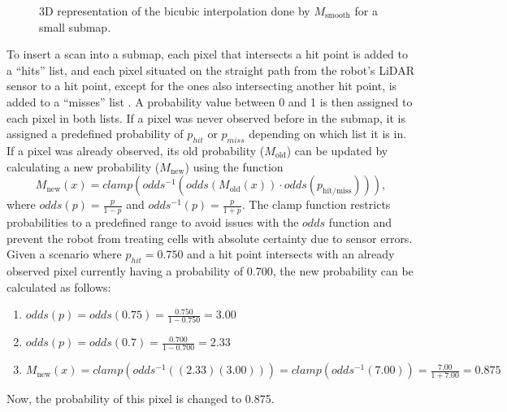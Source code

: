 \begin{figure}[!htb]
    \centering
    \qquad
    \caption{3D representation of the bicubic interpolation done by $M_\text{smooth}$ for a small submap.}
    \label{fig:bicubic}
\end{figure}

To insert a scan into a submap, each pixel that intersects a hit point is added to a ``hits'' list, and each pixel situated on the straight path from the robot's LiDAR sensor to a hit point, except for the ones also intersecting another hit point, is added to a ``misses'' list \parencite{hessRealtimeLoopClosure2016}. A probability value between 0 and 1 is then assigned to each pixel in both lists. If a pixel was never observed before in the submap, it is assigned a predefined probability of $p_{hit}$ or $p_{miss}$ depending on which list it is in. If a pixel was already observed, its old probability ($M_\text{old}$) can be updated by calculating a new probability ($M_\text{new}$) using the function
\[
    M_\text{new}(x)=clamp(odds^{-1}(odds(M_\text{old}(x))\cdot odds(p_\text{hit/miss}))),
\]
where $odds(p)=\frac{p}{1-p}$ and $odds^{-1}(p)=\frac{p}{1+p}$. The clamp function restricts probabilities to a predefined range to avoid issues with the $odds$ function and prevent the robot from treating cells with absolute certainty due to sensor errors. Given a scenario where $p_{hit}=0.750$ and a hit point intersects with an already observed pixel currently having a probability of 0.700, the new probability can be calculated as follows:
\begin{enumerate}
    \item $odds(p)=odds(0.75)=\frac{0.750}{1-0.750}=3.00$
    \item $odds(p)=odds(0.7)=\frac{0.700}{1-0.700}=2.33$
    \item $M_\text{new}(x)=clamp(odds^{-1}((2.33)(3.00)))=clamp(odds^{-1}(7.00))=\frac{7.00}{1+7.00}=0.875$
\end{enumerate}
Now, the probability of this pixel is changed to 0.875.

